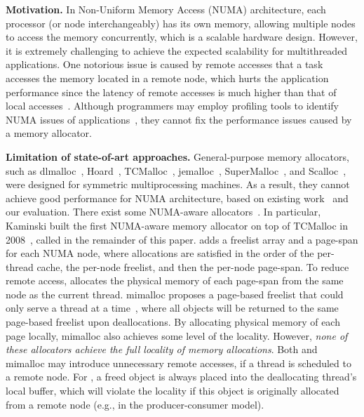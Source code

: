 \textbf{Motivation.} In Non-Uniform Memory Access (NUMA) architecture, each processor (or node interchangeably) has its own memory, allowing multiple nodes to access the memory concurrently, which is a scalable hardware design. 
However, it is extremely challenging to achieve the expected scalability for multithreaded applications. One notorious issue is caused by remote accesses that a task accesses the memory located in a remote node, which hurts the application performance since the latency of remote accesses is much higher than that of local accesses~\cite{Blagodurov}. 
Although programmers may employ profiling tools to identify NUMA issues of applications~\cite{Intel:VTune, Memphis, Lachaize:2012:MMP:2342821.2342826, XuNuma, NumaMMA, 7847070, NumaPerf}, they cannot fix the performance issues caused by a memory allocator.


\textbf{Limitation of state-of-art approaches.} General-purpose memory allocators, such as dlmalloc~\cite{dlmalloc},  Hoard~\cite{Hoard}, TCMalloc~\cite{tcmalloc}, jemalloc~\cite{jemalloc}, SuperMalloc~\cite{supermalloc}, and  Scalloc~\cite{Scalloc},  were designed for symmetric multiprocessing machines. As a result, they cannot achieve good performance for NUMA architecture, based on existing work~\cite{tcmallocnew, yang2019jarena} and our evaluation. There exist some NUMA-aware allocators~\cite{tcmallocnew, tcmalloc2, kim2013node, yang2019jarena, mimalloc}. In particular, Kaminski built the first NUMA-aware memory allocator on top of TCMalloc in 2008~\cite{tcmallocnew}, called \TN{} in the remainder of this paper. \TN{} adds a freelist array and a page-span for each NUMA node, where allocations are satisfied in the order of the per-thread cache, the per-node freelist, and then the per-node page-span. To reduce remote access, \TN{} allocates the physical memory of each page-span from the same node as the current thread. mimalloc proposes a page-based freelist that could only serve a thread at a time~\cite{mimalloc}, where all objects will be returned to the same page-based freelist upon deallocations. By allocating physical memory of each page locally, mimalloc also achieves some level of the locality. However, \textit{none of these allocators achieve the full locality of memory allocations}. Both \TN{} and mimalloc may introduce unnecessary remote accesses, if a thread is scheduled to a remote node. For \TN{}, a freed object is always placed into the deallocating thread's local buffer, which will violate the locality if this object is originally allocated from a remote node  (e.g., in the producer-consumer model). 

